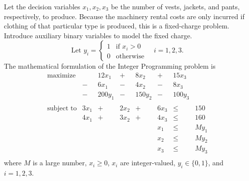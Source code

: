 \begin{enumerate}
\begin{solution}
  \bs
Let the decision variables $x_1,x_2,x_3$ be the number of vests, jackets, and 
pants, respectively, to produce. Because the machinery rental costs are only
incurred if clothing of that particular type is produced, this is a fixed-charge
problem. Introduce auxiliary binary variables to model the fixed charge.
\[
\text{Let $y_i$} = 
\begin{cases}
1 & \text{if $x_i > 0$} \\
0 & \text{otherwise}
\end{cases}
\quad i = 1,2,3.
\]
The mathematical formulation of the Integer Programming problem is
\[
\begin{array}{lrrrrrrl}
\textrm{maximize} &   & 12x_1 & + & 8x_2 & + & 15x_3 & \\
                  & - & 6x_1  & - & 4x_2 & - & 8x_3  & \\
                  & - & 200y_1& - & 150y_2&- & 100y_3& \\
& & & & & & &\\
\textrm{subject to} & 3x_1 & + & 2x_2 & + & 6x_3 & \leq & 150 \\
                    & 4x_1 & + & 3x_2 & + & 4x_3 & \leq & 160 \\
& & & & & x_1 & \leq & My_1 \\
& & & & & x_2 & \leq & My_2 \\
& & & & & x_3 & \leq & My_3 \\
\end{array}
\]
where $M$ is a large number, $x_i \geq 0$, $x_i$ are integer-valued, 
$y_i \in \{0,1\}$, and $i = 1,2,3$.
\end{solution}

\end{enumerate}
